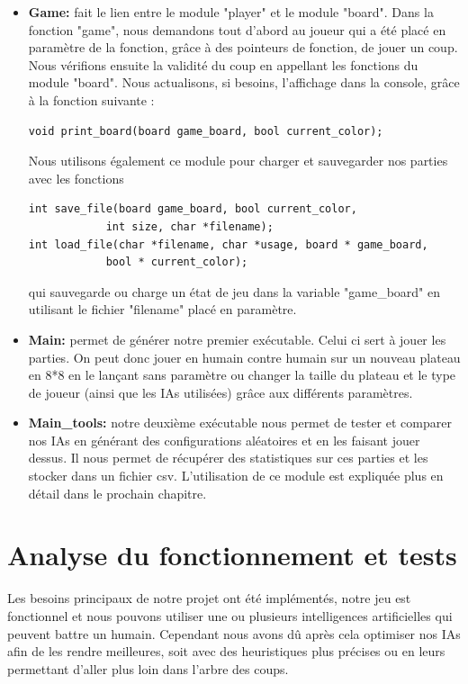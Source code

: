 \documentclass[12pt]{article}
\begin{document}
\begin{itemize}
\item \textbf{Game:} fait le lien entre le module "player" et le module "board". Dans la fonction "game", nous demandons tout d'abord au joueur qui a été placé en paramètre de la fonction, grâce à des pointeurs de fonction, de jouer un coup. Nous vérifions ensuite la validité du coup en appellant les fonctions du module "board". Nous actualisons, si besoins, l'affichage dans la console, grâce à la fonction suivante : 
\begin{verbatim} 
void print_board(board game_board, bool current_color); 
\end{verbatim}
Nous utilisons également ce module pour charger et sauvegarder nos parties avec les fonctions 
\begin{verbatim} 
int save_file(board game_board, bool current_color, 
            int size, char *filename);
int load_file(char *filename, char *usage, board * game_board,
            bool * current_color);
\end{verbatim}
qui sauvegarde ou charge un état de jeu dans la variable "game\_board" en utilisant le fichier "filename" placé en paramètre.
\item \textbf{Main:} permet de générer notre premier exécutable. Celui ci sert à jouer les parties. On peut donc jouer en humain contre humain sur un nouveau plateau en 8*8 en le lançant sans paramètre ou changer la taille du plateau et le type de joueur (ainsi que les IAs utilisées) grâce aux différents paramètres. 

\item \textbf{Main\_tools:} notre deuxième exécutable nous permet de tester et comparer nos IAs en générant des configurations aléatoires et en les faisant jouer dessus. Il nous permet de récupérer des statistiques sur ces parties et les stocker dans un fichier csv. L'utilisation de ce module est expliquée plus en détail dans le prochain chapitre. 
\end{itemize}

\section{Analyse du fonctionnement et tests}
\label{sec:analyse}

Les besoins principaux de notre projet ont été implémentés, notre jeu est fonctionnel et nous pouvons utiliser une ou plusieurs intelligences artificielles qui peuvent battre un humain. Cependant nous avons d\^u après cela optimiser nos IAs afin de les rendre meilleures, soit avec des heuristiques plus précises ou en leurs permettant d'aller plus loin dans l'arbre des coups.
\end{document}
